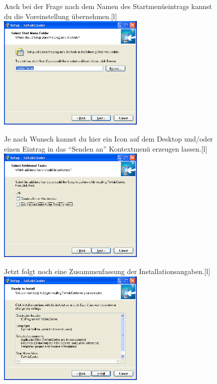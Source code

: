 \begin{figure}[hb]
	\begin{captionbeside}{Auch bei der Frage nach dem Namen des Startmenüeintrags kannst du die Voreinstellung übernehmen.}[l]
		\includegraphics[width=7cm]{images/TeXnicCenter-install-05.png}
	\end{captionbeside}
	\label{fig:install24}
\end{figure}

\begin{figure}[thb]
	\begin{captionbeside}{Je nach Wunsch kannst du hier ein Icon auf dem Desktop und/oder einen Eintrag in das \enquote{Senden an} Kontextmenü erzeugen lassen.}[l]
		\includegraphics[width=7cm]{images/TeXnicCenter-install-06.png}
	\end{captionbeside}
	\label{fig:install25}
\end{figure}

\begin{figure}[thb]
	\begin{captionbeside}{Jetzt folgt noch eine Zusammenfassung der Installationsangaben.}[l]
		\includegraphics[width=7cm]{images/TeXnicCenter-install-07.png}
	\end{captionbeside}
	\label{fig:install26}
\end{figure}

